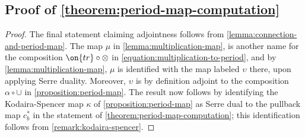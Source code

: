 \documentclass[12 pt]{amsart}
\theoremstyle{plain}
\theoremstyle{definition}
\theoremstyle{remark}
\numberwithin{equation}{section}
\begin{document}
\subsection{Proof of \autoref{theorem:period-map-computation}}
\begin{proof}
\label{subsection:proof-period-map}
	The final statement claiming adjointness follows from
	\autoref{lemma:connection-and-period-map}.
	The map $\mu$ in \autoref{lemma:multiplication-map}, 
	is another name for the composition	
	$\on{tr} \circ \otimes$ in \eqref{equation:multiplication-to-period},
	and by \autoref{lemma:multiplication-map},
	$\mu$ is identified with the map labeled $\upsilon$ there, upon applying
	Serre duality.
	Moreover, $\upsilon$ is by definition adjoint to the composition $\alpha \circ \cup$
	in \autoref{proposition:period-map}.
	The result now follows by identifying the Kodaira-Spencer map $\kappa$
	of \autoref{proposition:period-map} as Serre dual to the pullback map
	$c_b^*$ in the statement of \autoref{theorem:period-map-computation};
	this identification follows from \autoref{remark:kodaira-spencer}.
\end{proof}



\end{document}
